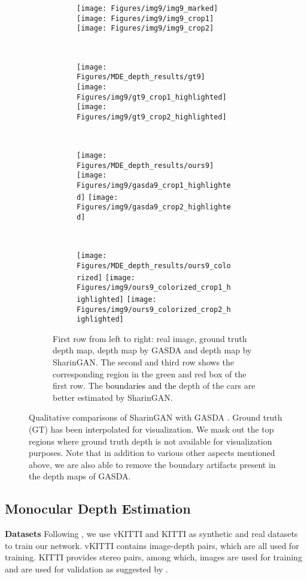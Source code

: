 \documentclass[10pt,twocolumn,letterpaper]{article}
\newcommand{\camready}[1]{\textcolor{black}{#1}}
\begin{document}
\begin{figure*}
\begin{subfigure}[t]{\linewidth}
    \begin{subfigure}[t]{0.25\linewidth}
        \texttt{[image: Figures/img9/img9\_marked]}
        \texttt{[image: Figures/img9/img9\_crop1]}
        \texttt{[image: Figures/img9/img9\_crop2]}
\end{subfigure}~
    \begin{subfigure}[t]{0.25\linewidth}
        \texttt{[image: Figures/MDE\_depth\_results/gt9]}
        \texttt{[image: Figures/img9/gt9\_crop1\_highlighted]}
        \texttt{[image: Figures/img9/gt9\_crop2\_highlighted]}
\end{subfigure}~
    \begin{subfigure}[t]{0.25\linewidth}
        \texttt{[image: Figures/MDE\_depth\_results/ours9]}
        \texttt{[image: Figures/img9/gasda9\_crop1\_highlighted]}
        \texttt{[image: Figures/img9/gasda9\_crop2\_highlighted]}
\end{subfigure}~
    \begin{subfigure}[t]{0.25\linewidth}
        \texttt{[image: Figures/MDE\_depth\_results/ours9\_colorized]}
        \texttt{[image: Figures/img9/ours9\_colorized\_crop1\_highlighted]}
        \texttt{[image: Figures/img9/ours9\_colorized\_crop2\_highlighted]}
\end{subfigure}\caption{First row from left to right: real image, ground truth depth map, depth map by GASDA \cite{GASDA} and depth map by SharinGAN. The second and third row shows the corresponding region in the green and red box of the first row. The \camready{boundaries and the} depth of the cars are better estimated by SharinGAN.}
\end{subfigure}

\caption{Qualitative comparisons of SharinGAN with GASDA \cite{GASDA}. Ground truth (GT) has been interpolated for visualization. We mask out the top regions where ground truth depth is not available for visualization purposes. Note that in addition to various other aspects mentioned above, we are also able to remove the boundary artifacts present in the depth maps of GASDA.}
\vspace{-1mm}
\label{fig:MDE_SharinGAN_visualizations}
\end{figure*}

\subsection{Monocular Depth Estimation}
\textbf{Datasets} Following \cite{GASDA}, we use vKITTI \cite{vKITTI} and KITTI \cite{KITTI} as synthetic and real datasets to train our network.
vKITTI contains  image-depth pairs, which are all used for training.
KITTI \cite{KITTI} provides  stereo pairs, among which,  images are used for training and  are used for validation as suggested by \cite{GASDA}.
\end{document}
